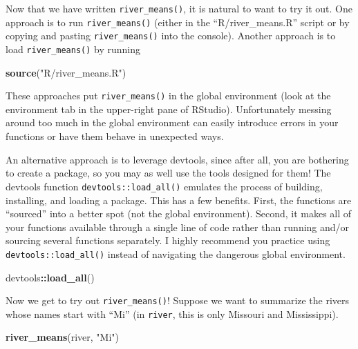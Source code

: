 \documentclass[
]{book}
\newenvironment{Shaded}{\begin{snugshade}}{\end{snugshade}}
\newcommand{\KeywordTok}[1]{\textcolor[rgb]{0.13,0.29,0.53}{\textbf{#1}}}
\newcommand{\NormalTok}[1]{#1}
\newcommand{\OperatorTok}[1]{\textcolor[rgb]{0.81,0.36,0.00}{\textbf{#1}}}
\newcommand{\StringTok}[1]{\textcolor[rgb]{0.31,0.60,0.02}{#1}}
\begin{document}
Now that we have written \texttt{river\_means()}, it is natural to want to try it out. One approach is to run \texttt{river\_means()} (either in the ``R/river\_means.R'' script or by copying and pasting \texttt{river\_means()} into the console). Another approach is to load \texttt{river\_means()} by running

\begin{Shaded}
\begin{Highlighting}[]
\KeywordTok{source}\NormalTok{(}\StringTok{"R/river_means.R"}\NormalTok{)}
\end{Highlighting}
\end{Shaded}

These approaches put \texttt{river\_means()} in the global environment (look at the environment tab in the upper-right pane of RStudio). Unfortunately messing around too much in the global environment can easily introduce errors in your functions or have them behave in unexpected ways.

An alternative approach is to leverage devtools, since after all, you are bothering to create a package, so you may as well use the tools designed for them! The devtools function \texttt{devtools::load\_all()} emulates the process of building, installing, and loading a package. This has a few benefits. First, the functions are ``sourced'' into a better spot (not the global environment). Second, it makes all of your functions available through a single line of code rather than running and/or sourcing several functions separately. I highly recommend you practice using \texttt{devtools::load\_all()} instead of navigating the dangerous global environment.

\begin{Shaded}
\begin{Highlighting}[]
\NormalTok{devtools}\OperatorTok{::}\KeywordTok{load_all}\NormalTok{()}
\end{Highlighting}
\end{Shaded}

Now we get to try out \texttt{river\_means()}! Suppose we want to summarize the rivers whose names start with ``Mi'' (in \texttt{river}, this is only Missouri and Mississippi).

\begin{Shaded}
\begin{Highlighting}[]
\KeywordTok{river_means}\NormalTok{(river, }\StringTok{"Mi"}\NormalTok{)}
\end{Highlighting}
\end{Shaded}
\end{document}
